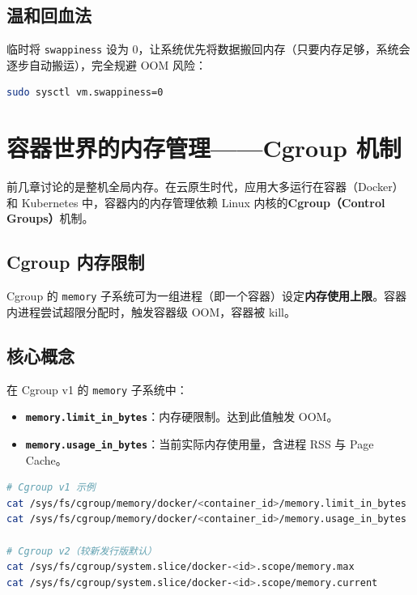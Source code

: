 \section{温和回血法}

临时将 \texttt{swappiness} 设为 0，让系统优先将数据搬回内存（只要内存足够，系统会逐步自动搬运），完全规避 OOM 风险：

\begin{lstlisting}[language=bash]
sudo sysctl vm.swappiness=0
\end{lstlisting}


\chapter{容器世界的内存管理——Cgroup 机制}

前几章讨论的是整机全局内存。在云原生时代，应用大多运行在容器（Docker）和 Kubernetes 中，容器内的内存管理依赖 Linux 内核的\textbf{Cgroup（Control Groups）}机制。

\section{Cgroup 内存限制}

Cgroup 的 \texttt{memory} 子系统可为一组进程（即一个容器）设定\textbf{内存使用上限}。容器内进程尝试超限分配时，触发容器级 OOM，容器被 kill。

\section{核心概念}

在 Cgroup v1 的 \texttt{memory} 子系统中：

\begin{itemize}[leftmargin=2cm]
	\item \textbf{\texttt{memory.limit\_in\_bytes}}：内存硬限制。达到此值触发 OOM。
	\item \textbf{\texttt{memory.usage\_in\_bytes}}：当前实际内存使用量，含进程 RSS 与 Page Cache。
\end{itemize}

\begin{lstlisting}[language=bash]
# Cgroup v1 示例
cat /sys/fs/cgroup/memory/docker/<container_id>/memory.limit_in_bytes
cat /sys/fs/cgroup/memory/docker/<container_id>/memory.usage_in_bytes

# Cgroup v2（较新发行版默认）
cat /sys/fs/cgroup/system.slice/docker-<id>.scope/memory.max
cat /sys/fs/cgroup/system.slice/docker-<id>.scope/memory.current
\end{lstlisting}

